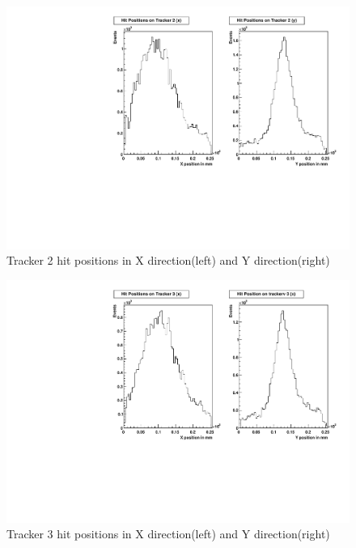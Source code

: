 \begin{figure}[!htbp]
\centering
\includegraphics[width=5.1in]{figures/GEM/Tracker2_Hit_position_Run1897.pdf}
\caption{Tracker 2 hit positions in X direction(left) and Y direction(right)}\label{fig:t2hit}
\end{figure}
\begin{figure}[!htbp]
\centering
\includegraphics[width=5.1in]{figures/GEM/Tracker3_Hit_position_Run1897.pdf}
\caption{Tracker 3 hit positions in X direction(left) and Y direction(right)}\label{fig:t3hit}
\end{figure}
